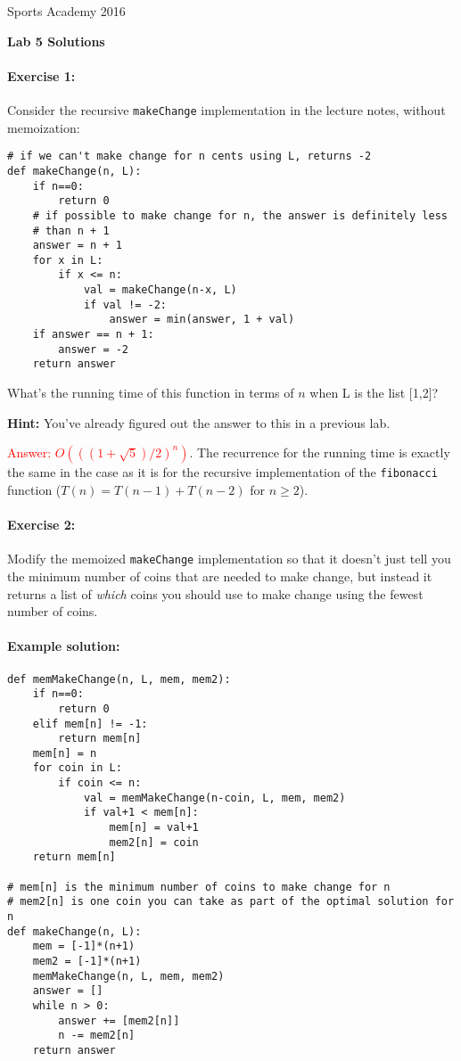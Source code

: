 \documentclass[11pt]{article}
\newcommand{\ans}[1]{\textcolor{red}{#1}}
\newlength{\toppush}
\newcommand{\htitle}[2]{\noindent\vspace*{-\toppush}\newline\parbox{6.5in}
 {\large Sports Academy \hfill #1\newline
\hspace*{\fill}{\bf Algorithms and Programming for High Schoolers} \hspace*{\fill} \newline
\mbox{}\hrulefill\mbox{}}\vspace*{1ex}\mbox{}\newline
\begin{center}{\Large\bf #2}\end{center}}
\begin{document}
\htitle{2016}{Lab 5 Solutions}

\paragraph{Exercise 1:}
Consider the recursive \texttt{makeChange} implementation in the
lecture notes, without memoization:

\begin{verbatim}
# if we can't make change for n cents using L, returns -2
def makeChange(n, L):
    if n==0:
        return 0
    # if possible to make change for n, the answer is definitely less
    # than n + 1
    answer = n + 1
    for x in L:
        if x <= n:
            val = makeChange(n-x, L)
            if val != -2:
                answer = min(answer, 1 + val)
    if answer == n + 1:
        answer = -2
    return answer
\end{verbatim}

What's the running time of this function in terms of $n$ when L is
the list [1,2]?

\medskip

\textbf{Hint:} You've already figured out the answer
to this in a previous lab.

\medskip

\ans{Answer: $O(((1+\sqrt{5})/2)^n)$}.  The recurrence for the running time is
exactly the same in the case as it is for the recursive implementation
of the \texttt{fibonacci} function ($T(n) = T(n-1) + T(n-2)$ for $n\ge
2$).

\paragraph{Exercise 2:}
Modify the memoized \texttt{makeChange} implementation so that it
doesn't just tell you the minimum number of coins that are needed to
make change, but instead it returns a list of {\em which} coins you
should use to make change using the fewest number of coins.

\paragraph{Example solution:}
\begin{verbatim}
def memMakeChange(n, L, mem, mem2):
    if n==0:
        return 0
    elif mem[n] != -1:
        return mem[n]
    mem[n] = n
    for coin in L:
        if coin <= n:
            val = memMakeChange(n-coin, L, mem, mem2)
            if val+1 < mem[n]:
                mem[n] = val+1
                mem2[n] = coin
    return mem[n]

# mem[n] is the minimum number of coins to make change for n
# mem2[n] is one coin you can take as part of the optimal solution for n
def makeChange(n, L):
    mem = [-1]*(n+1)
    mem2 = [-1]*(n+1)
    memMakeChange(n, L, mem, mem2)
    answer = []
    while n > 0:
        answer += [mem2[n]]
        n -= mem2[n]
    return answer
\end{verbatim}
\end{document}
